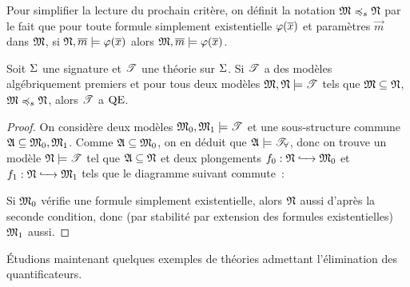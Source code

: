\begin{notation}
  Pour simplifier la lecture du prochain critère, on définit la notation
  $\mathfrak{M}\preccurlyeq_{s}\mathfrak{N}$ par le fait que pour toute formule simplement
  existentielle $\varphi(\overline{x})$ et paramètres $\vec m$ dans
  $\mathfrak{M}$, si $\mathfrak{N},\overline{m} \models\varphi(\overline{x})$ alors
  $\mathfrak{M},\overline{m}\models\varphi(\overline{x})$.
\end{notation}

\begin{theorem}
  Soit $\Sigma$ une signature et $\mathscr T$ une théorie sur $\Sigma$. Si $\mathscr T$ a
  des modèles algébriquement premiers et pour tous deux modèles
  $\mathfrak{M},\mathfrak{N}\models\mathscr T$ tels que $\mathfrak{M}\subseteq\mathfrak{N}$,
  $\mathfrak{M}\preccurlyeq_{s}\mathfrak{N}$, alors $\mathscr T$ a $\operatorname{QE}$.
\end{theorem}

\begin{proof}
  On considère deux modèles $\mathfrak{M}_0,\mathfrak{M}_1\models\mathscr T$ et une
  sous-structure commune $\mathfrak{A}\subseteq\mathfrak{M}_0,\mathfrak{M}_1$. Comme
  $\mathfrak{A}\subseteq\mathfrak{M}_0$, on en déduit que $\mathfrak{A}\models\mathscr T_{\forall}$,
  donc on trouve un modèle $\mathfrak{N}\models\mathscr T$ tel que $\mathfrak{A}\subseteq\mathfrak{N}$
  et deux plongements $f_0 : \displaystyle \mathfrak{N} \xhookrightarrow{\quad} \mathfrak{M}_0$ et
  $f_1 : \displaystyle \mathfrak{N} \xhookrightarrow{\quad} \mathfrak{M}_1$ tels que le diagramme
  suivant commute~:
  \begin{center}
  \end{center}
  Si $\mathfrak{M}_0$ vérifie une formule simplement existentielle, alors $\mathfrak{N}$
  aussi d'après la seconde condition, donc (par stabilité par extension des
  formules existentielles) $\mathfrak{M}_1$ aussi.
\end{proof}

\'Etudions maintenant quelques exemples de théories admettant l'élimination des
quantificateurs.

